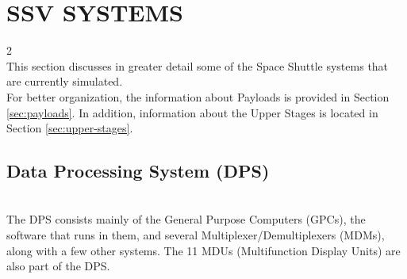 \documentclass[Space_Shuttle_Vessel_Manual.tex]{subfiles}
\begin{document}
\section{SSV SYSTEMS}
\label{sec:ssv-systems}
\begin{multicols*}{2}
\renewcommand{\cfttoctitlefont}{\bf}
\localtableofcontents
\noindent
\\
This section discusses in greater detail some of the Space Shuttle systems that are currently simulated.\\
For better organization, the information about Payloads is provided in Section \ref{sec:payloads}. In addition, information about the Upper Stages is located in Section \ref{sec:upper-stages}.
\newpage


\subsection{Data Processing System (DPS)}
\noindent
\\
The DPS consists mainly of the General Purpose Computers (GPCs), the software that runs in them, and several Multiplexer/Demultiplexers (MDMs), along with a few other systems. The 11 MDUs (Multifunction Display Units) are also part of the DPS.

\end{multicols*}
\end{document}
